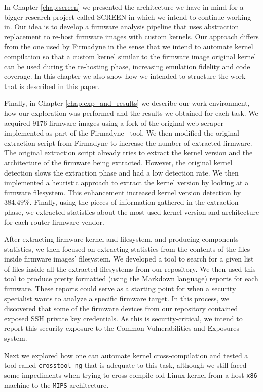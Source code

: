 In Chapter \ref{chap:screen} we presented the architecture we have in mind for a bigger research project called SCREEN in which we intend to continue working in. Our idea is to develop a firmware analysis pipeline that uses abstraction replacement to re-host firmware images with custom kernels. Our approach differs from the one used by Firmadyne in the sense that we intend to automate kernel compilation so that a custom kernel similar to the firmware image original kernel can be used during the re-hosting phase, increasing emulation fidelity and code coverage. In this chapter we also show how we intended to structure the work that is described in this paper.

Finally, in Chapter \ref{chap:exp_and_results} we describe our work environment, how our exploration was performed and the results we obtained for each task. We acquired 9176 firmware images using a fork of the original web scraper implemented as part of the Firmadyne~\cite{firmadyne} tool. We then modified the original extraction script from Firmadyne to increase the number of extracted firmware. The original extraction script already tries to extract the kernel version and the architecture of the firmware being extracted. However, the original kernel detection slows the extraction phase and had a low detection rate. We then implemented a heuristic approach to extract the kernel version by looking at a firmware filesystem. This enhancement increased kernel version detection by $384.49\%$. Finally, using the pieces of information gathered in the extraction phase, we extracted statistics about the most used kernel version and architecture for each router firmware vendor.

After extracting firmware kernel and filesystem, and producing components statistics, we then focused on extracting statistics from the contents of the files inside firmware images' filesystem. We developed a tool to search for a given list of files inside all the extracted filesystems from our repository. We then used this tool to produce pretty formatted (using the Markdown language) reports for each firmware. These reports could serve as a starting point for when a security specialist wants to analyze a specific firmware target. In this process, we discovered that some of the firmware devices from our repository contained exposed SSH private key credentials. As this is security-critical, we intend to report this security exposure to the Common Vulnerabilities and Exposures system.

Next we explored how one can automate kernel cross-compilation and tested a tool called {\tt crosstool-ng} that is adequate to this task, although we still faced some impediments when trying to cross-compile old Linux kernel from a host {\tt x86} machine to the {\tt MIPS} architecture.

